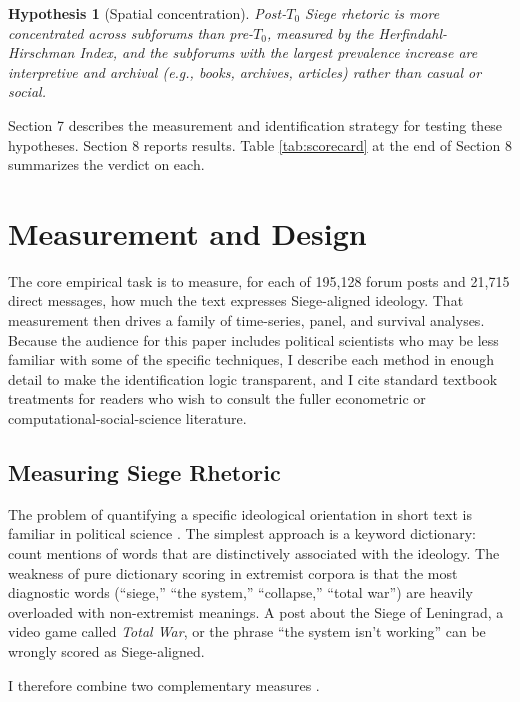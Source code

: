 \documentclass[bibtex,autowc,nonblind]{apsr_submission}
\newtheorem{hyp}{Hypothesis}
\begin{document}
\begin{hyp}[Spatial concentration]
Post-$T_0$ Siege rhetoric is more concentrated across subforums than pre-$T_0$, measured by the Herfindahl-Hirschman Index, and the subforums with the largest prevalence increase are interpretive and archival (e.g., books, archives, articles) rather than casual or social.
\end{hyp}

Section 7 describes the measurement and identification strategy for testing these hypotheses. Section 8 reports results. Table \ref{tab:scorecard} at the end of Section 8 summarizes the verdict on each.

\section{Measurement and Design}

The core empirical task is to measure, for each of 195,128 forum posts and 21,715 direct messages, how much the text expresses Siege-aligned ideology. That measurement then drives a family of time-series, panel, and survival analyses. Because the audience for this paper includes political scientists who may be less familiar with some of the specific techniques, I describe each method in enough detail to make the identification logic transparent, and I cite standard textbook treatments for readers who wish to consult the fuller econometric or computational-social-science literature.

\subsection{Measuring Siege Rhetoric}

The problem of quantifying a specific ideological orientation in short text is familiar in political science \citep{laver2003extracting, grimmer2013text, young2012affective, gentzkow2019text}. The simplest approach is a keyword dictionary: count mentions of words that are distinctively associated with the ideology. The weakness of pure dictionary scoring in extremist corpora is that the most diagnostic words (``siege,'' ``the system,'' ``collapse,'' ``total war'') are heavily overloaded with non-extremist meanings. A post about the Siege of Leningrad, a video game called \textit{Total War}, or the phrase ``the system isn't working'' can be wrongly scored as Siege-aligned.

I therefore combine two complementary measures \citep{rodriguez:2022a}.
\end{document}
